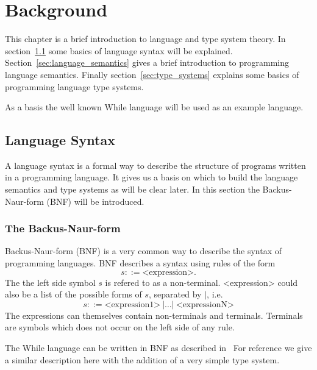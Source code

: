 \chapter{Background} \label{cha:background}

This chapter is a brief introduction to language and type system theory. In
section~\ref{sec:language_syntax} some basics of language syntax will be
explained. Section~\ref{sec:language_semantics} gives a brief introduction to
programming language semantics. Finally section~\ref{sec:type_systems} explains
some basics of programming language type systems.

As a basis the well known While language will be used as an example language.


\section{Language Syntax} \label{sec:language_syntax}

A language syntax is a formal way to describe the structure of programs written
in a programming language. It gives us a basis on which to build the language
semantics and type systems as will be clear later. In this section the
Backus-Naur-form (BNF) will be introduced. 

\subsection{The Backus-Naur-form} \label{sub:the_backus_naur_form} 

Backus-Naur-form (BNF) is a very common way to describe the syntax of
programming languages. BNF describes a syntax using rules of the form
\begin{equation*}
  s ::= \text{<expression>}.
\end{equation*}
The the left side symbol $s$ is refered to as a non-terminal. <expression> could
also be a list of the
possible forms of $s$, separated by $|$, i.e. 
\begin{equation*}
  s ::= \text{<expression1>} \: | \dots | \: \text{<expressionN>}
\end{equation*}
The expressions can themselves contain non-terminals and terminals.
Terminals are symbols which does not occur on the left side of any rule.

The While language can be written in BNF as described
in~\parencite{nielson2007semantics} For reference we give a similar description
here with the addition of a very simple type system.

